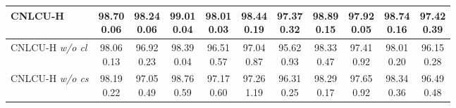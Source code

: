 \documentclass[11pt]{article}
\begin{document}
\begin{table}[!htbp]
\begin{tabular}{l |cc|cc|cc|cc|cc}
			\hline
			CNLCU-H & \makecell{98.70\\ \scriptsize{0.06}} & \makecell{98.24\\ \scriptsize{0.06}} & \makecell{99.01\\ \scriptsize{0.04}} & \makecell{98.01\\ \scriptsize{0.03}} & \makecell{98.44\\ \scriptsize{0.19}} & \makecell{97.37\\ \scriptsize{0.32}} & \makecell{98.89\\ \scriptsize{0.15}} & \makecell{97.92\\ \scriptsize{0.05}} & \makecell{98.74\\ \scriptsize{0.16}} & \makecell{97.42\\ \scriptsize{0.39}}	\\\hline
			CNLCU-H \textit{w/o cl} & \makecell{98.06\\ \scriptsize{0.13}} & \makecell{96.92\\ \scriptsize{0.23}} & \makecell{98.39\\ \scriptsize{0.04}} & \makecell{96.51\\ \scriptsize{0.57}} & \makecell{97.04\\ \scriptsize{0.87}} & \makecell{95.62\\ \scriptsize{0.93}} & \makecell{98.33\\ \scriptsize{0.47}} & \makecell{97.41\\ \scriptsize{0.92}} & \makecell{98.01\\ \scriptsize{0.20}} & \makecell{96.15\\ \scriptsize{0.28}}	\\	  \hline
			CNLCU-H \textit{w/o cs} & \makecell{98.19\\ \scriptsize{0.22}} & \makecell{97.05\\ \scriptsize{0.49}} & \makecell{98.76\\ \scriptsize{0.59}} & \makecell{97.17\\ \scriptsize{0.60}} & \makecell{97.26\\ \scriptsize{1.19}} & \makecell{96.31\\ \scriptsize{0.25}} & \makecell{98.29\\ \scriptsize{0.17}} & \makecell{97.65\\ \scriptsize{0.92}} & \makecell{98.34\\ \scriptsize{0.36}} & \makecell{96.49\\ \scriptsize{0.48}}\\	 \hline

\end{tabular}
\end{table}
\end{document}
